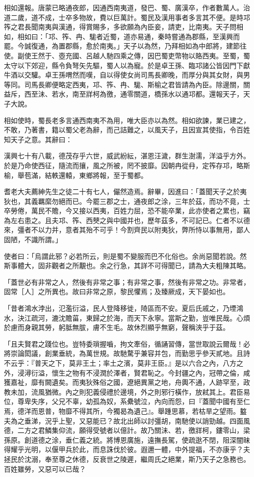 \begin{pinyinscope}
相如還報。唐蒙已略通夜郎，因通西南夷道，發巴、蜀、廣漢卒，作者數萬人。治道二歲，道不成，士卒多物故，費以巨萬計。蜀民及漢用事者多言其不便。是時邛筰之君長聞南夷與漢通，得賞賜多，多欲願為內臣妾，請吏，比南夷。天子問相如，相如曰：「邛、筰、冉、駹者近蜀，道亦易通，秦時嘗通為郡縣，至漢興而罷。今誠復通，為置郡縣，愈於南夷。」天子以為然，乃拜相如為中郎將，建節往使。副使王然于、壺充國、呂越人馳四乘之傳，因巴蜀吏幣物以賂西夷。至蜀，蜀太守以下郊迎，縣令負弩矢先驅，蜀人以為寵。於是卓王孫、臨邛諸公皆因門下獻牛酒以交驩。卓王孫喟然而嘆，自以得使女尚司馬長卿晚，而厚分與其女財，與男等同。司馬長卿便略定西夷，邛、筰、冉、駹、斯榆之君皆請為內臣。除邊關，關益斥，西至沬、若水，南至牂柯為徼，通零關道，橋孫水以通邛都。還報天子，天子大說。

相如使時，蜀長老多言通西南夷不為用，唯大臣亦以為然。相如欲諫，業已建之，不敢，乃著書，籍以蜀父老為辭，而己詰難之，以風天子，且因宣其使指，令百姓知天子之意。其辭曰：

漢興七十有八載，德茂存乎六世，威武紛紜，湛恩汪濊，群生澍濡，洋溢乎方外。於是乃命使西征，隨流而攘，風之所被，罔不披靡。因朝冉從冄，定筰存邛，略斯榆，舉苞滿，結軼還轅，東鄉將報，至于蜀都。

耆老大夫薦紳先生之徒二十有七人，儼然造焉。辭畢，因進曰：「蓋聞天子之於夷狄也，其義羈縻勿絕而已。今罷三郡之士，通夜郎之涂，三年於茲，而功不竟，士卒勞倦，萬民不贍，今又接以西夷，百姓力屈，恐不能卒業，此亦使者之累也，竊為左右患之。且夫邛、筰、西僰之與中國并也，歷年茲多，不可記已。仁者不以德來，彊者不以力并，意者其殆不可乎！今割齊民以附夷狄，弊所恃以事無用，鄙人固陋，不識所謂。」

使者曰：「烏謂此邪？必若所云，則是蜀不變服而巴不化俗也。余尚惡聞若說。然斯事體大，固非觀者之所覯也。余之行急，其詳不可得聞已，請為大夫粗陳其略。

「蓋世必有非常之人，然後有非常之事；有非常之事，然後有非常之功。非常者，固常［人］之所異也。故曰非常之原，黎民懼焉；及臻厥成，天下晏如也。

「昔者鴻水浡出，氾濫衍溢，民人登降移徙，陭區而不安。夏后氏戚之，乃堙鴻水，決江疏河，漉沈贍菑，東歸之於海，而天下永寧。當斯之勤，豈唯民哉。心煩於慮而身親其勞，躬胝無胈，膚不生毛。故休烈顯乎無窮，聲稱浹乎于茲。

「且夫賢君之踐位也。豈特委瑣握嚙，拘文牽俗，循誦習傳，當世取說云爾哉！必將崇論閎議，創業垂統，為萬世規。故馳騖乎兼容并包，而勤思乎參天貳地。且詩不云乎：『普天之下，莫非王土；率土之濱，莫非王臣。』是以六合之內，八方之外，浸潯衍溢，懷生之物有不浸潤於澤者，賢君恥之。今封疆之內，冠帶之倫，咸獲嘉祉，靡有闕遺矣。而夷狄殊俗之國，遼絕異黨之地，舟輿不通，人跡罕至，政教未加，流風猶微。內之則犯義侵禮於邊境，外之則邪行橫作，放弒其上。君臣易位，尊卑失序，父兄不辜，幼孤為奴，系纍號泣，內向而怨，曰『蓋聞中國有至仁焉，德洋而恩普，物靡不得其所，今獨曷為遺己』。舉踵思慕，若枯旱之望雨。盭夫為之垂涕，況乎上聖，又惡能已？故北出師以討彊胡，南馳使以誚勁越。四面風德，二方之君鱗集仰流，願得受號者以億計。故乃關沬、若，徼牂柯，鏤零山，梁孫原。創道德之涂，垂仁義之統。將博恩廣施，遠撫長駕，使疏逖不閉，阻深闇昧得耀乎光明，以偃甲兵於此，而息誅伐於彼。遐邇一體，中外提福，不亦康乎？夫拯民於沈溺，奉至尊之休德，反衰世之陵遲，繼周氏之絕業，斯乃天子之急務也。百姓雖勞，又惡可以已哉？


\end{pinyinscope}
